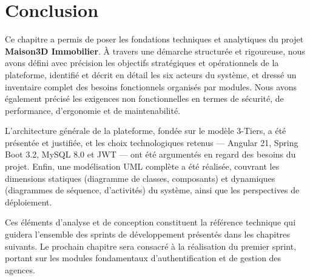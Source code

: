 \documentclass[a4paper,12pt]{report}
\begin{document}

\section{Conclusion}

Ce chapitre a permis de poser les fondations techniques et analytiques du projet \textbf{Maison3D Immobilier}. À travers une démarche structurée et rigoureuse, nous avons défini avec précision les objectifs stratégiques et opérationnels de la plateforme, identifié et décrit en détail les six acteurs du système, et dressé un inventaire complet des besoins fonctionnels organisés par modules. Nous avons également précisé les exigences non fonctionnelles en termes de sécurité, de performance, d'ergonomie et de maintenabilité.

L'architecture générale de la plateforme, fondée sur le modèle 3-Tiers, a été présentée et justifiée, et les choix technologiques retenus — Angular 21, Spring Boot 3.2, MySQL 8.0 et JWT — ont été argumentés en regard des besoins du projet. Enfin, une modélisation UML complète a été réalisée, couvrant les dimensions statiques (diagramme de classes, composants) et dynamiques (diagrammes de séquence, d'activités) du système, ainsi que les perspectives de déploiement.

Ces éléments d'analyse et de conception constituent la référence technique qui guidera l'ensemble des sprints de développement présentés dans les chapitres suivants. Le prochain chapitre sera consacré à la réalisation du premier sprint, portant sur les modules fondamentaux d'authentification et de gestion des agences.
\end{document}
